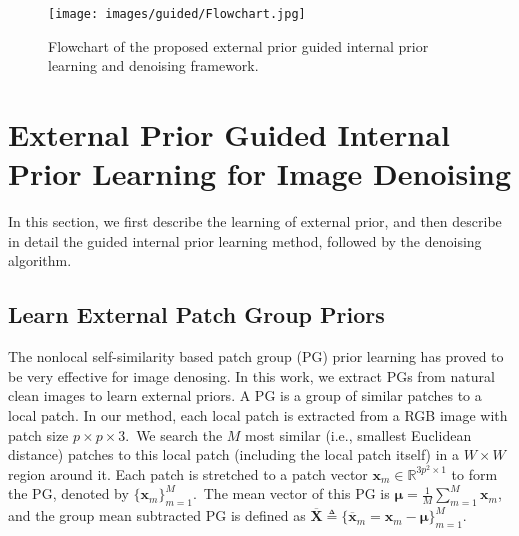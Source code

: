 \begin{figure}[t!]
\label{fig3-2}
\centering
\captionsetup{justification=centering,margin=0.1cm}
\texttt{[image: images/guided/Flowchart.jpg]}
\centering
\vspace{-3mm}
\caption{Flowchart of the proposed external prior guided internal prior learning and denoising framework.}
\end{figure}



\section{External Prior Guided Internal Prior Learning for Image Denoising}

In this section, we first describe the learning of external prior, and then describe in detail the guided internal prior learning method, followed by the denoising algorithm.

\subsection{Learn External Patch Group Priors}

The nonlocal self-similarity based patch group (PG) prior learning \cite{pgpd} has proved to be very effective for image denosing. In this work, we extract PGs from natural clean images to learn external priors. A PG is a group of similar patches to a local patch. In our method, each local patch is extracted from a RGB image with patch size $p\times p \times 3$.\ We search the $M$ most similar (i.e., smallest Euclidean distance) patches to this local patch (including the local patch itself) in a $W\times W$ region around it. Each patch is stretched to a patch vector $\mathbf{x}_{m}\in \mathbb{R}^{3p^{2}\times1}$ to form the PG, denoted by $\{\mathbf{x}_{m}\}_{m=1}^{M}$.\ The mean vector of this PG is $\bm{\mu}=\frac{1}{M}\sum_{m=1}^{M}\mathbf{x}_{m}$, and the group mean subtracted PG is defined as $\mathbf{\overline{X}}\triangleq \{\mathbf{\overline{x}}_{m}=\mathbf{x}_{m}-\bm{\mu}\}_{m=1}^{M}$.

